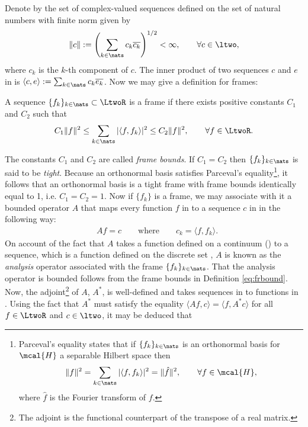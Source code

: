  Denote by \ltwo the set of  complex-valued sequences defined on the set of natural numbers \nats with finite norm given by 
 \begin{align}
   \Vert c \Vert := \left( \sum_{k \in \nats} c_k \overline{c_k} \right)^{1/2} <   \infty, \qquad \forall c \in \ltwo,\notag
   \label{}
 \end{align}
 where $c_k$ is the $k$-th component of $c$. The inner product of two sequences $c$ and $e$ in \ltwo is $\langle c, e \rangle := \sum_{k \in \nats} c_k \overline{e_k}$. Now we may give a definition for frames:
\begin{defn}\label{eq:frbound}
   A sequence $\{f_k\}_{k \in \nats} \subset \LtwoR$ is a frame if there exists positive constants $C_1$ and $C_2$ such that
  \begin{align}
    C_1\Vert f \Vert^2 \le \sum_{k \in \nats}\vert \langle f, f_k\rangle \vert^2 \le  C_2 \Vert f \Vert^2,
  \qquad  \forall f \in \LtwoR. \notag 
  \end{align}
\end{defn}
\noindent The  constants $C_1$ and $C_2$ are called   \emph{frame bounds}. If $C_1 = C_2$ then $\{f_k \}_{k \in \nats}$ is said to be \emph{tight}. Because an  orthonormal basis satisfies  Parceval's equality\footnote{
  Parceval's equality states that if $\{f_k\}_{k \in \nats}$ is an orthonormal basis for $\mcal{H}$ a separable Hilbert space then
  \begin{align}
    \Vert f \Vert^2 = \sum_{k \in \nats} \vert \langle f, f_k \rangle \vert^2 =\Vert \hat{f} \Vert^2, \qquad \forall f \in \mcal{H},  \notag
    \label{}
  \end{align}
  where $\hat{f}$ is the Fourier transform of $f$.
}, it follows that an orthonormal basis is a tight frame with frame bounds identically equal to 1, i.e. $C_1 = C_2 = 1$.  Now if $\{f_k\}$ is a frame, we may associate with it a bounded operator $A$ that maps every function  $f$ in  \LtwoR to a sequence $c$ in \ltwo in the following way:
\begin{align}
  &A f = c \qquad \text{where} \qquad c_k = \langle f, f_k\rangle. 
  \label{eq:analysis}
\end{align}
On account of the fact that $A$ takes a function defined on a continuum (\real) to a sequence, which is a function defined on the discrete set \nats, $A$ is known as the \emph{analysis} operator associated with the frame $\{f_k\}_{k \in \nats}$. That the analysis operator is bounded follows from the frame bounds in  Definition \eqref{eq:frbound}. Now,  the adjoint\footnote{The adjoint is the functional counterpart of the transpose of a real matrix.}  of $A$, $A^*$, is well-defined and takes sequences in \ltwo to functions in \LtwoR.  Using the fact that  $A^*$ must satisfy the equality $\langle A f , c\rangle = \langle f,A^*c\rangle$ for all $f \in \LtwoR$ and $c \in \ltwo$, it may be deduced that
